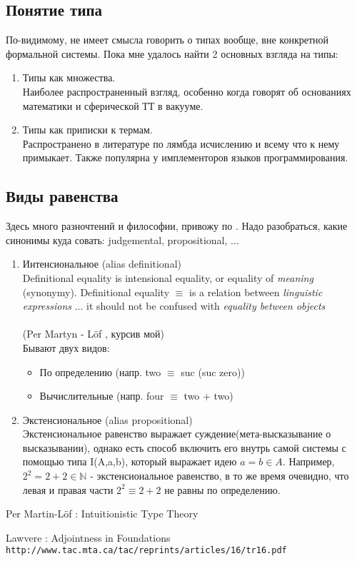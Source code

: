 \documentclass[10pt,a4paper]{article}
\theoremstyle{definition}
\begin{document}
\subsection{Понятие типа}
По-видимому, не имеет смысла говорить о типах вообще, вне конкретной формальной системы. Пока мне удалось найти 2 основных взгляда на типы:
\begin{enumerate}
\item Типы как множества. \\
  Наиболее распространенный взгляд, особенно когда говорят об основаниях математики и сферической ТТ в вакууме.
\item Типы как приписки к термам. \\
  Распространено в литературе по лямбда исчислению и всему что к нему примыкает. Также популярна у имплементоров языков программирования.
\end{enumerate}

\subsection{Виды равенства}

Здесь много разночтений и философии, привожу по \cite{PML1980}.
Надо разобраться, какие синонимы куда совать: judgemental, propositional, ...

\begin{enumerate}
\item Интенсиональное (alias definitional)\\

  Definitional equality is intensional equality, or equality of \textit{meaning} (synonymy). Definitional equality $\equiv$ is a relation between \textit{linguistic expressions} ... it should not be confused with \textit{equality between objects}\\ \\
  (Per Martyn - L{\"o}f \cite{PML1980}, курсив мой)\\

    Бывают двух видов:
    \begin{itemize}
  \item По определению (напр. two $\equiv$ suc (suc zero))
  \item Вычислительные (напр. four $\equiv$ two + two)
    \end{itemize}

\item Экстенсиональное (alias propositional) \\
  Экстенсиональное равенство выражает суждение(мета-высказывание о высказывании), однако есть способ включить его внутрь самой системы с помощью типа I(A,a,b), который выражает идею $a = b \in A$. Например, $ 2^2 = 2 + 2 \in \mathbb{N} $ - экстенсиональное равенство, в то же время очевидно, что левая и правая части  $2^2 \equiv 2 + 2 $ не равны по определению.\\

\end{enumerate}

\newpage


\begin{thebibliography}{9}

Per Martin-Löf : Intuitionistic Type Theory

Lawvere : Adjointness in Foundations
\\\texttt{http://www.tac.mta.ca/tac/reprints/articles/16/tr16.pdf}

\end{thebibliography}
 
\end{document}
